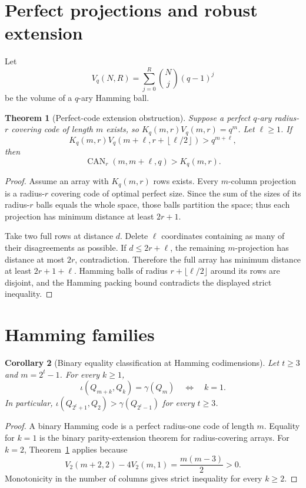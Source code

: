 \documentclass[11pt]{article}
\newtheorem{theorem}{Theorem}[section]
\newtheorem{corollary}[theorem]{Corollary}
\theoremstyle{definition}
\theoremstyle{remark}
\newcommand{\CAN}{\operatorname{CAN}}
\newcommand{\Kcov}{K}
\newcommand{\Vol}{V}
\begin{document}
\section{Perfect projections and robust extension}

Let
\[
 \Vol_q(N,R)=\sum_{j=0}^R {N\choose j}(q-1)^j
\]
be the volume of a $q$-ary Hamming ball.

\begin{theorem}[Perfect-code extension obstruction]\label{thm:perfect}
Suppose a perfect $q$-ary radius-$r$ covering code of length $m$ exists, so
$\Kcov_q(m,r)\Vol_q(m,r)=q^m$.  Let $\ell\ge1$.  If
\[
 \Kcov_q(m,r)\Vol_q\!\left(m+\ell,
     r+\left\lfloor\ell/2\right\rfloor\right)>q^{m+\ell},
\]
then
\[
 \CAN_r(m,m+\ell,q)>\Kcov_q(m,r).
\]
\end{theorem}

\begin{proof}
Assume an array with $\Kcov_q(m,r)$ rows exists.  Every $m$-column projection
is a radius-$r$ covering code of optimal perfect size.  Since the sum of the
sizes of its radius-$r$ balls equals the whole space, those balls partition the
space; thus each projection has minimum distance at least $2r+1$.

Take two full rows at distance $d$.  Delete $\ell$ coordinates containing as
many of their disagreements as possible.  If $d\le2r+\ell$, the remaining
$m$-projection has distance at most $2r$, contradiction.  Therefore the full
array has minimum distance at least $2r+1+\ell$.  Hamming balls of radius
$r+\lfloor\ell/2\rfloor$ around its rows are disjoint, and the Hamming packing
bound contradicts the displayed strict inequality.
\end{proof}

\section{Hamming families}

\begin{corollary}[Binary equality classification at Hamming codimensions]
\label{cor:binary-hamming}
Let $t\ge3$ and $m=2^t-1$.  For every $k\ge1$,
\[
  \iota(Q_{m+k},Q_k)=\gamma(Q_m)
  \quad\Longleftrightarrow\quad k=1.
\]
In particular, $\iota(Q_{2^t+1},Q_2)>\gamma(Q_{2^t-1})$ for every $t\ge3$.
\end{corollary}

\begin{proof}
A binary Hamming code is a perfect radius-one code of length $m$.  Equality for
$k=1$ is the binary parity-extension theorem for radius-covering arrays.  For
$k=2$, Theorem~\ref{thm:perfect} applies because
\[
 \Vol_2(m+2,2)-4\Vol_2(m,1)=\frac{m(m-3)}2>0.
\]
Monotonicity in the number of columns gives strict inequality for every
$k\ge2$.
\end{proof}
\end{document}
